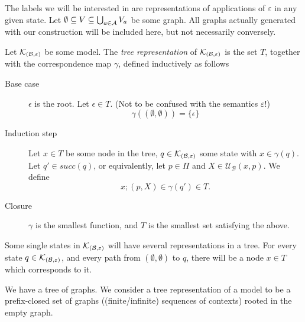 \documentclass{llncs}
\newcommand{\kmod}[2]{{\cal K}_{(#1,#2)}}
\newcommand{\update}[3]{{\mathcal U}_{#1}(#2,#3)}
\newcommand{\views}{\mathcal B}
\newcommand{\sem}{\varepsilon}
\begin{document}
The labels we will be interested in are representations of applications of $\sem$ in any given state. Let $\emptyset \subseteq V \subseteq \bigcup_{a \in \mathcal A} V_a$ be some graph. All graphs actually generated with our construction will be included here, but not necessarily conversely. 

\begin{definition} Let $\kmod \views \sem$ be some model. The \emph{tree representation} of $\kmod \views \sem$ is the set $T$, together with the correspondence map $\gamma$, defined inductively as follows
\begin{description}
\item[Base case] $\epsilon$ is the root. Let $\epsilon \in T$. (Not to be confused with the semantics $\sem$!) 
$$\gamma((\emptyset, \emptyset)) = \{\epsilon\}$$ 
\item[Induction step] Let $x \in T$ be some node in the tree, $q \in \kmod \views \sem$ some state with $x \in \gamma(q)$. Let $q' \in succ(q)$, or equivalently, let $p \in \Pi$ and $X \in \update \views x p$. We define $$x;(p, X) \in \gamma(q') \in T.$$
\item[Closure] $\gamma$ is the smallest function, and $T$ is the smallest set satisfying the above.
\end{description}
\end{definition}

Some single states in $\kmod \views \sem$ will have several representations in a tree. For every state $q \in \kmod \views \sem$, and every path from $(\emptyset, \emptyset)$ to $q$, there will be a node $x \in T$ which corresponds to it.

We have a tree of graphs. We consider a tree representation of a model to be a prefix-closed set of graphs ((finite/infinite) sequences of contexts) rooted in the empty graph.
\end{document}
